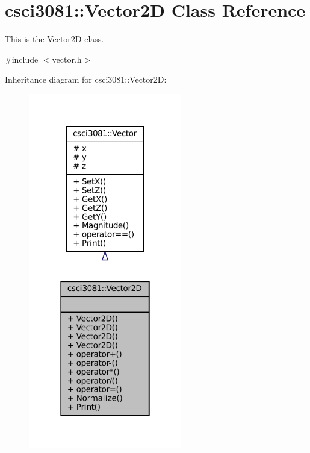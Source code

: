 \hypertarget{classcsci3081_1_1Vector2D}{}\section{csci3081\+:\+:Vector2D Class Reference}
\label{classcsci3081_1_1Vector2D}


This is the \hyperlink{classcsci3081_1_1Vector2D}{Vector2D} class.  




{\ttfamily \#include $<$vector.\+h$>$}



Inheritance diagram for csci3081\+:\+:Vector2D\+:
\nopagebreak
\begin{figure}[H]
\begin{center}
\leavevmode
\includegraphics[width=190pt]{classcsci3081_1_1Vector2D__inherit__graph}
\end{center}
\end{figure}
